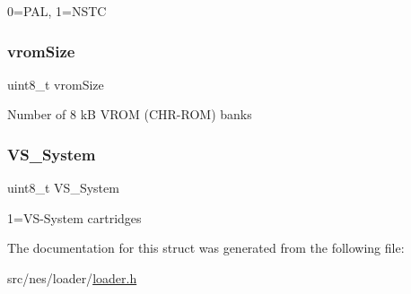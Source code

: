 0=P\+AL, 1=N\+S\+TC \mbox{\label{struct_header_a10decd110cedd575129373467ebbb23a}} 
\subsubsection{\texorpdfstring{vrom\+Size}{vromSize}}
{\footnotesize\ttfamily uint8\+\_\+t vrom\+Size}

Number of 8 kB V\+R\+OM (C\+H\+R-\/\+R\+OM) banks \mbox{\label{struct_header_a23f751e0854a728c81d30b364ed95366}} 
\subsubsection{\texorpdfstring{V\+S\+\_\+\+System}{VS\_System}}
{\footnotesize\ttfamily uint8\+\_\+t V\+S\+\_\+\+System}

1=V\+S-\/\+System cartridges 

The documentation for this struct was generated from the following file\+:\begin{DoxyCompactItemize}
\item 
src/nes/loader/\hyperlink{loader_8h}{loader.\+h}\end{DoxyCompactItemize}
